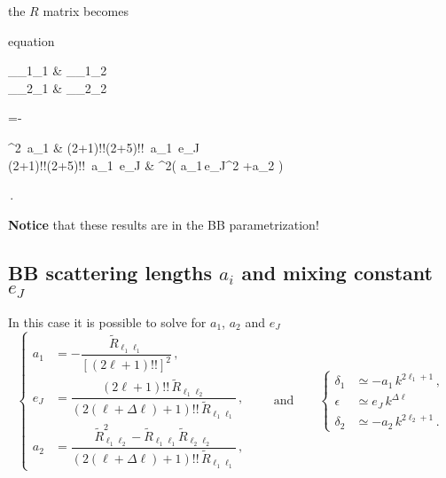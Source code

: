 \documentclass[10pt,a4paper]{article}
\newcommand{\mand}{\qquad\text{and}\qquad}
\begin{document}
		the $R$ matrix becomes
		\begin{empheq}[box=\mymath]{equation}
			\begin{pmatrix}
				_{\ell_1\ell_1} & 
				_{\ell_1\ell_2} \\ 
				_{\ell_2\ell_1} & 
				_{\ell_2\ell_2} \\
			\end{pmatrix}
			=-
			\begin{pmatrix}
				\left[(2\ell+1)!!\right]^2\,
				a_1 & 
				(2\ell+1)!!(2\ell+5)!!\,
				a_1\,
				e_J\\
				(2\ell+1)!!(2\ell+5)!!\,
				a_1\,
				e_J &
				\left[(2\ell+5)!!\right]^2\left(
				a_1\,e_J^2
				+a_2
				\right)
			\end{pmatrix}\,.			
		\end{empheq}
		\textbf{Notice }that these results are in the BB parametrization! 
		
		\subsection{BB scattering lengths $a_i$ and mixing constant $e_J$}
		In this case it is possible to solve for $a_1$, $a_2$ and $e_J$
		\begin{equation}
			\begin{cases}
				a_1 &=- \dfrac{\tilde{R}_{\ell_1\ell_1}}{^2}\,,\\[2.5ex]
				e_J &=	
				\dfrac{(2\ell+1)!!\,\tilde{R}_{\ell_1\ell_2}}
				{(2(\ell+\Delta\ell)+1)!!\,\tilde{R}_{\ell_1\ell_1}}\,,\\[2.5ex]
				a_2 &=
				\dfrac{\tilde{R}_{\ell_1\ell_2}^2-\tilde{R}_{\ell_1\ell_1}\tilde{R}_{\ell_2\ell_2}}{(2(\ell+\Delta\ell)+1)!!\,\tilde{R}_{\ell_1\ell_1}}\,,
			\end{cases}
			\mand
			\begin{cases}
				\delta_1 &\simeq -a_1 \,k^{2\ell_1+1}\,,\\
				\epsilon &\simeq e_J\,k^{\Delta \ell}\,\\
				\delta_2 & \simeq - a_2\,k^{2\ell_2+1}\,.
			\end{cases}
			\label{eq:lowEnergiesBB}
		\end{equation}
		
		
\end{document}
